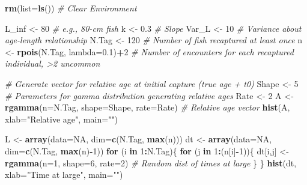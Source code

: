\documentclass[
]{krantz}
\makeatletter
\newenvironment{Shaded}{\begin{snugshade}}{\end{snugshade}}
\newcommand{\AttributeTok}[1]{\textcolor[rgb]{0.27,0.27,0.27}{#1}}
\newcommand{\CommentTok}[1]{\textcolor[rgb]{0.37,0.37,0.37}{\textit{#1}}}
\newcommand{\ConstantTok}[1]{\textcolor[rgb]{0.37,0.37,0.37}{#1}}
\newcommand{\ControlFlowTok}[1]{\textcolor[rgb]{0.27,0.27,0.27}{\textbf{#1}}}
\newcommand{\DecValTok}[1]{\textcolor[rgb]{0.06,0.06,0.06}{#1}}
\newcommand{\FloatTok}[1]{\textcolor[rgb]{0.06,0.06,0.06}{#1}}
\newcommand{\FunctionTok}[1]{\textcolor[rgb]{0.27,0.27,0.27}{\textbf{#1}}}
\newcommand{\NormalTok}[1]{#1}
\newcommand{\OtherTok}[1]{\textcolor[rgb]{0.37,0.37,0.37}{#1}}
\newcommand{\SpecialCharTok}[1]{\textcolor[rgb]{0.43,0.43,0.43}{\textbf{#1}}}
\newcommand{\StringTok}[1]{\textcolor[rgb]{0.5,0.5,0.5}{#1}}
\newenvironment{kframe}{%
\medskip{}
\setlength{\fboxsep}{.8em}
 \def\at@end@of@kframe{}%
 \ifinner\ifhmode%
  \def\at@end@of@kframe{\end{minipage}}%
  \begin{minipage}{\columnwidth}%
 \fi\fi%
 \def\FrameCommand##1{\hskip\@totalleftmargin \hskip-\fboxsep
 \colorbox{shadecolor}{##1}\hskip-\fboxsep
     \hskip-\linewidth \hskip-\@totalleftmargin \hskip\columnwidth}%
 \MakeFramed {\advance\hsize-\width
   \@totalleftmargin\z@ \linewidth\hsize
   \@setminipage}}%
 {\par\unskip\endMakeFramed%
 \at@end@of@kframe}
\renewenvironment{Shaded}{\begin{kframe}}{\end{kframe}}
\makeatother
\begin{document}
\begin{Shaded}
\begin{Highlighting}[]
\FunctionTok{rm}\NormalTok{(}\AttributeTok{list=}\FunctionTok{ls}\NormalTok{()) }\CommentTok{\# Clear Environment}

\NormalTok{L\_inf }\OtherTok{\textless{}{-}} \DecValTok{80}  \CommentTok{\# e.g., 80{-}cm fish}
\NormalTok{k }\OtherTok{\textless{}{-}} \FloatTok{0.3} \CommentTok{\# Slope}
\NormalTok{Var\_L }\OtherTok{\textless{}{-}} \DecValTok{10} \CommentTok{\# Variance about age{-}length relationship}
\NormalTok{N.Tag }\OtherTok{\textless{}{-}} \DecValTok{120} \CommentTok{\# Number of fish recaptured at least once}
\NormalTok{n }\OtherTok{\textless{}{-}} \FunctionTok{rpois}\NormalTok{(N.Tag, }\AttributeTok{lambda=}\FloatTok{0.1}\NormalTok{)}\SpecialCharTok{+}\DecValTok{2} 
  \CommentTok{\# Number of encounters for each recaptured individual, \textgreater{}2 uncommon}

\CommentTok{\# Generate vector for relative age at initial capture (true age + t0)}
\NormalTok{Shape }\OtherTok{\textless{}{-}} \DecValTok{5} \CommentTok{\# Parameters for gamma distribution generating relative ages}
\NormalTok{Rate }\OtherTok{\textless{}{-}} \DecValTok{2}
\NormalTok{A }\OtherTok{\textless{}{-}} \FunctionTok{rgamma}\NormalTok{(}\AttributeTok{n=}\NormalTok{N.Tag, }\AttributeTok{shape=}\NormalTok{Shape, }\AttributeTok{rate=}\NormalTok{Rate) }\CommentTok{\# Relative age vector}
\FunctionTok{hist}\NormalTok{(A, }\AttributeTok{xlab=}\StringTok{"Relative age"}\NormalTok{, }\AttributeTok{main=}\StringTok{""}\NormalTok{)}

\NormalTok{L }\OtherTok{\textless{}{-}} \FunctionTok{array}\NormalTok{(}\AttributeTok{data=}\ConstantTok{NA}\NormalTok{, }\AttributeTok{dim=}\FunctionTok{c}\NormalTok{(N.Tag, }\FunctionTok{max}\NormalTok{(n)))}
\NormalTok{dt }\OtherTok{\textless{}{-}} \FunctionTok{array}\NormalTok{(}\AttributeTok{data=}\ConstantTok{NA}\NormalTok{, }\AttributeTok{dim=}\FunctionTok{c}\NormalTok{(N.Tag, }\FunctionTok{max}\NormalTok{(n)}\SpecialCharTok{{-}}\DecValTok{1}\NormalTok{))}
\ControlFlowTok{for}\NormalTok{ (i }\ControlFlowTok{in} \DecValTok{1}\SpecialCharTok{:}\NormalTok{N.Tag)\{}
  \ControlFlowTok{for}\NormalTok{ (j }\ControlFlowTok{in} \DecValTok{1}\SpecialCharTok{:}\NormalTok{(n[i]}\SpecialCharTok{{-}}\DecValTok{1}\NormalTok{))\{}
\NormalTok{    dt[i,j] }\OtherTok{\textless{}{-}} \FunctionTok{rgamma}\NormalTok{(}\AttributeTok{n=}\DecValTok{1}\NormalTok{, }\AttributeTok{shape=}\DecValTok{6}\NormalTok{, }\AttributeTok{rate=}\DecValTok{2}\NormalTok{) }
      \CommentTok{\# Random dist of times at large}
\NormalTok{  \}}
\NormalTok{\}}
\FunctionTok{hist}\NormalTok{(dt, }\AttributeTok{xlab=}\StringTok{"Time at large"}\NormalTok{, }\AttributeTok{main=}\StringTok{""}\NormalTok{)}


\end{Highlighting}
\end{Shaded}
\end{document}

